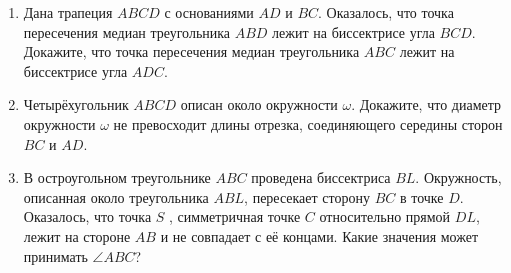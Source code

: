 \documentclass{article}
\begin{document}
\begin{enumerate}[label*=\protect\fbox{\arabic{enumi}}]
\item Дана трапеция $ABCD$ с основаниями $AD$ и $BC$. Оказалось, что точка пересечения медиан треугольника $ABD$ лежит на биссектрисе угла $BCD$. Докажите, что точка пересечения медиан треугольника $ABC$ лежит на биссектрисе угла $ADC$.

\item Четырёхугольник $ABCD$ описан около окружности $\omega$. Докажите, что диаметр окружности $\omega$ не превосходит длины отрезка, соединяющего середины сторон $BC$ и $AD$.

\item В остроугольном треугольнике $ABC$ проведена биссектриса $BL$. Окружность, описанная около треугольника $ABL$, пересекает сторону $BC$ в точке $D$. Оказалось, что точка $S$ , симметричная точке $C$ относительно прямой $DL$, лежит на стороне $AB$ и не совпадает с её концами. Какие значения
может принимать $\angle ABC$?




\end{enumerate}
\end{document}
